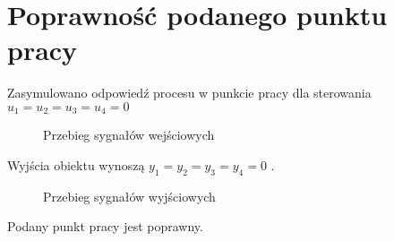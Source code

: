\section{Poprawność podanego punktu pracy}
\label{projekt:zad1}

Zasymulowano	odpowiedź	procesu	w	punkcie	pracy	dla	sterowania	
$u_{1} = u_{2} = u_{3} = u_{4} = 0$	

\ifdefined\CompileFigures
   \begin{figure}[H] 
      \centering
      
      \caption{Przebieg sygnałów wejściowych}
      \label{projekt:zad1:figure:proj_zadanie1uu}
   \end{figure}
\fi

\newpage
Wyjścia obiektu wynoszą $y_{1} = y_{2} = y_{3} = y_{4} = 0$	.

\ifdefined\CompileFigures
   \begin{figure}[H] 
      \centering
      
      \caption{Przebieg sygnałów wyjściowych}
      \label{projekt:zad1:figure:proj_zadanie1y}
   \end{figure}
\fi

Podany  punkt pracy jest poprawny.

\newpage
